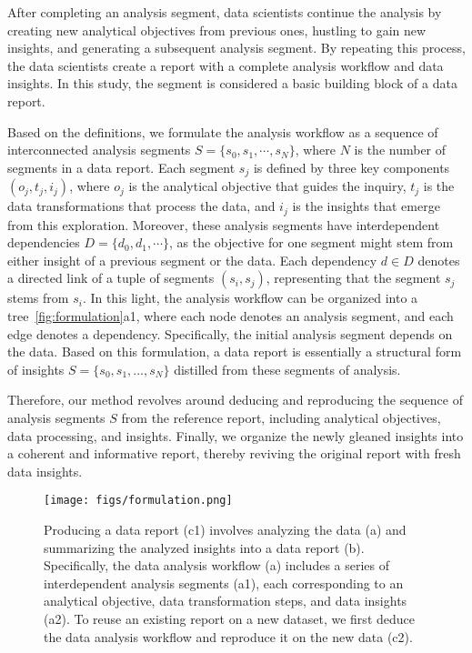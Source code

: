 After completing an analysis segment, data scientists continue the analysis by creating new analytical objectives from previous ones, hustling to gain new insights, and generating a subsequent analysis segment. 
By repeating this process, the data scientists create a report with a complete analysis workflow and data insights. 
In this study, the segment is considered a basic building block of a data report.

Based on the definitions, we formulate the analysis workflow as a sequence of interconnected analysis segments $S = \{s_0, s_1, \cdots, s_N\}$, where $N$ is the number of segments in a data report.
Each segment $s_j$ is defined by three key components $(o_j, t_j, i_j)$, where $o_j$ is the analytical objective that guides the inquiry, $t_j$ is the data transformations that process the data, and $i_j$ is the insights that emerge from this exploration. 
Moreover, these analysis segments have interdependent dependencies $D = \{d_0, d_1, \cdots\}$, as the objective for one segment might stem from either insight of a previous segment or the data.
Each dependency $d\in D$ denotes a directed link of a tuple of segments $(s_i, s_j)$, representing that the segment $s_j$ stems from $s_i$.
In this light, the analysis workflow can be organized into a tree~\autoref{fig:formulation}a1, where each node denotes an analysis segment, and each edge denotes a dependency. 
Specifically, the initial analysis segment depends on the data. 
Based on this formulation, a data report is essentially a structural form of insights $S = \{s_0, s_1, ..., s_N\}$ distilled from these segments of analysis. 

Therefore, our method revolves around deducing and reproducing the sequence of analysis segments $S$ from the reference report, including analytical objectives, data processing, and insights. 
Finally, we organize the newly gleaned insights into a coherent and informative report, thereby reviving the original report with fresh data insights.

\begin{figure}[!htb] 
  \centering
  \texttt{[image: figs/formulation.png]}
  \caption{
  Producing a data report (c1) involves analyzing the data (a) and summarizing the analyzed insights into a data report (b). 
  Specifically, the data analysis workflow (a) includes a series of interdependent analysis segments (a1), each corresponding to an analytical objective, data transformation steps, and data insights (a2). 
  To reuse an existing report on a new dataset, we first deduce the data analysis workflow and reproduce it on the new data (c2). 
  }
  \label{fig:formulation}
\end{figure}

